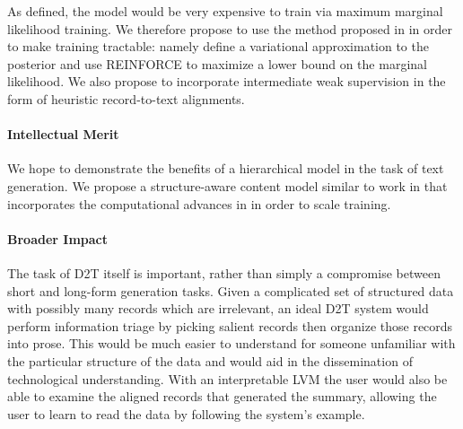\documentclass[11pt]{article}
\begin{document}
As defined, the model would be very expensive to train via maximum marginal likelihood
training. We therefore propose to use the method proposed in \citep{deng2018vattn}
in order to make training tractable: namely define a variational approximation to the
posterior and use REINFORCE to maximize a lower bound on the marginal likelihood.
We also propose to incorporate intermediate weak supervision in the form of
heuristic record-to-text alignments.

% 
\paragraph{Intellectual Merit}
We hope to demonstrate the benefits of a hierarchical model in the task of text generation.
We propose a structure-aware content model similar to
work in \citep{sauper2009wiki,wiseman2017d2t,liang2009semalign}
that incorporates the computational advances in \citep{deng2018vattn}
in order to scale training.

\paragraph{Broader Impact}
The task of D2T itself is important, rather than simply a compromise between
short and long-form generation tasks.
Given a complicated set of structured data with possibly many records
which are irrelevant, an ideal D2T system would perform information triage by 
picking salient records then organize those records into prose.
This would be much easier to understand for someone unfamiliar with the
particular structure of the data and would aid in the dissemination of 
technological understanding.
With an interpretable LVM the user would also be able to examine the aligned
records that generated the summary, allowing the user to learn to read
the data by following the system's example.
\end{document}
